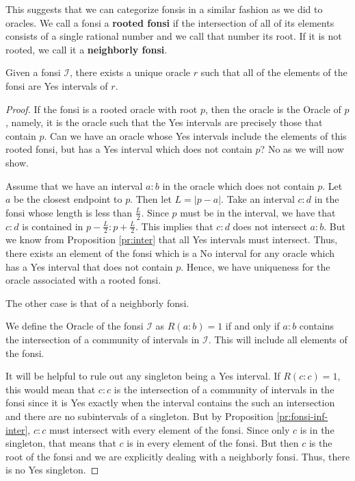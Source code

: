 \documentclass[12pt]{article}
\begin{document}
This suggests that we can categorize fonsis in a similar fashion as we did to oracles. We call a fonsi a \textbf{rooted fonsi} if the intersection of all of its elements consists of a single rational number and we call that number its root. If it is not rooted, we call it a \textbf{neighborly fonsi}. 

\begin{proposition}\label{pr:fon-oracle-exists}
Given a fonsi $\mathcal{I}$, there exists a unique oracle $r$ such that all of the elements of the fonsi are Yes intervals of $r$.
\end{proposition}

\begin{proof}
If the fonsi is a rooted oracle with root $p$, then the oracle is the Oracle of $p$, namely, it is the oracle such that the Yes intervals are precisely those that contain $p$. Can we have an oracle whose Yes intervals include the elements of this rooted fonsi, but has a Yes interval which does not contain $p$? No as we will now show. 

Assume that we have an interval $a:b$ in the oracle which does not contain $p$. Let $a$ be the closest endpoint to $p$. Then let $L = |p-a|$. Take an interval $c:d$ in the fonsi whose length is less than $\frac{L}{2}$. Since $p$ must be in the interval, we have that $c:d$ is contained in $p-\frac{L}{2}: p + \frac{L}{2}$. This implies that $c:d$ does not intersect $a:b$. But we know from Proposition \ref{pr:inter} that all Yes intervals must intersect. Thus, there exists an element of the fonsi which is a No interval for any oracle which has a Yes interval that does not contain $p$. Hence, we have uniqueness for the oracle associated with a rooted fonsi. 

The other case is that of a neighborly fonsi. 

We define the Oracle of the fonsi $\mathcal{I}$ as $R(a :b) = 1$ if and only if $a : b$ contains the intersection of a community of intervals in $\mathcal{I}$. This will include all elements of the fonsi. 

It will be helpful to rule out any singleton being a Yes interval. If $R(c:c)=1$, this would mean that $c:c$ is the intersection of a community of intervals in the fonsi since it is Yes exactly when the interval contains the such an intersection and there are no subintervals of a singleton. But by Proposition \ref{pr:fonsi-inf-inter}, $c:c$ must intersect with every element of the fonsi. Since only $c$ is in the singleton, that means that $c$ is in every element of the fonsi. But then $c$ is the root of the fonsi and we are explicitly dealing with a neighborly fonsi. Thus, there is no Yes singleton. 



\end{proof}
\end{document}
